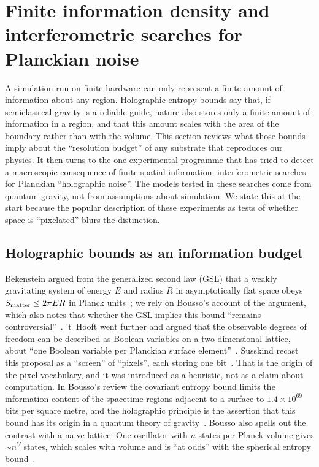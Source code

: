\section{Finite information density and interferometric searches for Planckian noise}
\label{sec:holographic}

A simulation run on finite hardware can only represent a finite amount of
information about any region. Holographic entropy bounds say that, if
semiclassical gravity is a reliable guide, nature also stores only a finite
amount of information in a region, and that this amount scales with the area of
the boundary rather than with the volume. This section reviews what those bounds
imply about the ``resolution budget'' of any substrate that reproduces our
physics. It then turns to the one experimental programme that has tried to
detect a macroscopic consequence of finite spatial information: interferometric
searches for Planckian ``holographic noise''. The models tested in these
searches come from quantum gravity, not from assumptions about simulation. We
state this at the start because the popular description of these experiments as
tests of whether space is ``pixelated'' blurs the distinction.

\subsection{Holographic bounds as an information budget}

Bekenstein argued from the generalized second law (GSL) that a weakly
gravitating system of energy $E$ and radius $R$ in asymptotically flat space
obeys $S_{\rm matter}\le 2\pi E R$ in Planck units~\cite{Bekenstein1981universal};
we rely on Bousso's account of the argument, which also notes that whether the
GSL implies this bound ``remains controversial''~\cite{Bousso2002holographic}.
't~Hooft went further and argued that the observable degrees of freedom can be
described as Boolean variables on a two-dimensional lattice, about ``one Boolean
variable per Planckian surface element''~\cite{tHooft1993dimensional}.
Susskind recast this proposal as a ``screen'' of ``pixels'', each storing one
bit~\cite{Susskind1995world}. That is the origin of the pixel vocabulary, and it
was introduced as a heuristic, not as a claim about computation. In Bousso's
review the covariant entropy bound limits the information content of the
spacetime regions adjacent to a surface to $1.4\times10^{69}$ bits per square
metre, and the holographic principle is the assertion that this bound has its
origin in a quantum theory of gravity~\cite{Bousso2002holographic}. Bousso also
spells out the contrast with a naive lattice. One oscillator with $n$ states per
Planck volume gives $\sim n^{V}$ states, which scales with volume and is ``at
odds'' with the spherical entropy bound~\cite{Bousso2002holographic}.

